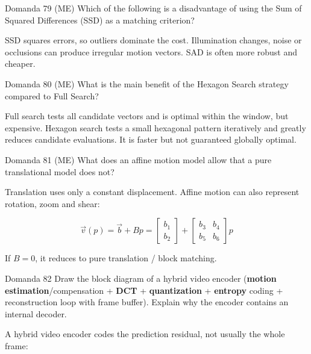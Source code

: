 \begin{questionbox}{Domanda 79}
(ME) Which of the following is a disadvantage of using the Sum of Squared Differences (SSD) as a matching criterion?
\end{questionbox}


SSD squares errors, so outliers dominate the cost. Illumination changes, noise or occlusions can produce irregular motion vectors. SAD is often more robust and cheaper.



\begin{questionbox}{Domanda 80}
(ME) What is the main benefit of the Hexagon Search strategy compared to Full Search?
\end{questionbox}


Full search tests all candidate vectors and is optimal within the window, but expensive. Hexagon search tests a small hexagonal pattern iteratively and greatly reduces candidate evaluations. It is faster but not guaranteed globally optimal.



\begin{questionbox}{Domanda 81}
(ME) What does an affine motion model allow that a pure translational model does not?
\end{questionbox}


Translation uses only a constant displacement. Affine motion can also represent rotation, zoom and shear:


$$
\vec{v}(p)=\vec{b}+Bp
=
\begin{bmatrix}b_1\\b_2\end{bmatrix}
+
\begin{bmatrix}b_3&b_4\\b_5&b_6\end{bmatrix}p
$$


If $B=0$, it reduces to pure translation / block matching.



\begin{questionbox}{Domanda 82}
Draw the block diagram of a hybrid video encoder (\textbf{motion estimation}/compensation + \textbf{DCT} + \textbf{quantization} + \textbf{entropy} coding + reconstruction loop with frame buffer). Explain why the encoder contains an internal decoder.
\end{questionbox}


A hybrid video encoder codes the prediction residual, not usually the whole frame:

